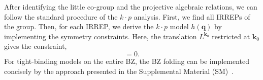 \documentclass[aps,prl,twocolumn,noshowpacs,superscriptaddress]{revtex4-1}
\def \H {\mathcal{H}}
\def \k {\bm{k}}
\begin{document}

After identifying the little co-group and the projective algebraic relations, we can follow the standard procedure of the $k\cdot p$ analysis. First, we find all IRREPs of the group. Then, for each IRREP, we derive the $k\cdot p$ model $h(\bm{q})$ by implementing the symmetry constraints. Here, the translation $L^{\k_0}$ restricted at $\k_0$ gives the constraint,
\begin{equation}
	[L^{\k_0},h(\bm{q})]=0.
\end{equation}
For tight-binding models on the entire BZ, the BZ folding can be implemented concisely by the approach presented in the Supplemental Material (SM)~\cite{SM}.



\end{document}
